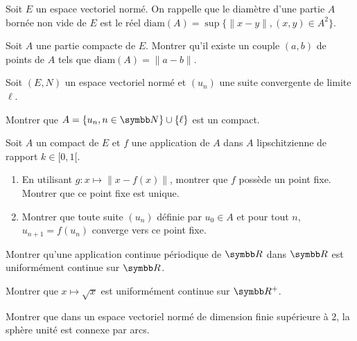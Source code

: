 \begin{exercice}
    Soit $E$ un espace vectoriel normé. On rappelle que le diamètre d'une partie $A$ bornée non vide de $E$ 
    est le réel $\text{diam}(A) = \sup \{ \|x-y\|, (x,y) \in A^{2} \}$.

    Soit $A$ une partie compacte de $E$. Montrer qu'il existe un couple $(a,b)$ de points de $A$ tels que $\text{diam}(A) = \|a-b\|$.
\end{exercice}

\begin{exercice}
    Soit $(E, N)$ un espace vectoriel normé et $(u_{n})$ une suite convergente de limite $\ell$.
    
    Montrer que $A = \{u_{n}, n \in \N\} \cup \{\ell\}$ est un compact.
\end{exercice}

\begin{exercice}
    Soit $A$ un compact de $E$ et $f$ une application de $A$ dans $A$ lipschitzienne de rapport $k \in [0,1[$.
    \begin{enumerate}
        \item En utilisant $g : x \mapsto \|x-f(x)\|$, montrer que $f$ possède un point fixe. Montrer que ce point fixe est unique.
        \item Montrer que toute suite $(u_{n})$ définie par $u_{0} \in A$ et pour tout $n$, $u_{n+1}=f(u_{n})$ converge vers ce point fixe.
    \end{enumerate}
\end{exercice}

\begin{exercice}
    Montrer qu'une application continue périodique de $\R$ dans $\R$ est uniformément continue sur $\R$.
\end{exercice}

\begin{exercice}
    Montrer que $x \mapsto \sqrt{x}$ est uniformément continue sur $\R^{+}$.
\end{exercice}

\begin{exercice}
    Montrer que dans un espace vectoriel normé de dimension finie supérieure à 2, la sphère unité est connexe par arcs.
\end{exercice}

